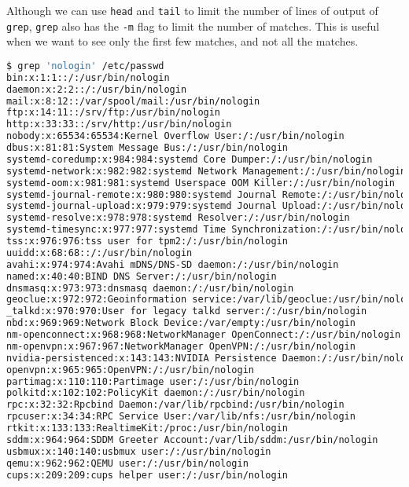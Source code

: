 Although we can use \lstinline|head| and \lstinline|tail| to limit the number of lines of output of \lstinline|grep|, \lstinline|grep| also has the \lstinline|-m| flag to limit the number of matches. This is useful when we want to see only the first few matches, and not all the matches.

\begin{lstlisting}[language=bash]
$ grep 'nologin' /etc/passwd
bin:x:1:1::/:/usr/bin/nologin
daemon:x:2:2::/:/usr/bin/nologin
mail:x:8:12::/var/spool/mail:/usr/bin/nologin
ftp:x:14:11::/srv/ftp:/usr/bin/nologin
http:x:33:33::/srv/http:/usr/bin/nologin
nobody:x:65534:65534:Kernel Overflow User:/:/usr/bin/nologin
dbus:x:81:81:System Message Bus:/:/usr/bin/nologin
systemd-coredump:x:984:984:systemd Core Dumper:/:/usr/bin/nologin
systemd-network:x:982:982:systemd Network Management:/:/usr/bin/nologin
systemd-oom:x:981:981:systemd Userspace OOM Killer:/:/usr/bin/nologin
systemd-journal-remote:x:980:980:systemd Journal Remote:/:/usr/bin/nologin
systemd-journal-upload:x:979:979:systemd Journal Upload:/:/usr/bin/nologin
systemd-resolve:x:978:978:systemd Resolver:/:/usr/bin/nologin
systemd-timesync:x:977:977:systemd Time Synchronization:/:/usr/bin/nologin
tss:x:976:976:tss user for tpm2:/:/usr/bin/nologin
uuidd:x:68:68::/:/usr/bin/nologin
avahi:x:974:974:Avahi mDNS/DNS-SD daemon:/:/usr/bin/nologin
named:x:40:40:BIND DNS Server:/:/usr/bin/nologin
dnsmasq:x:973:973:dnsmasq daemon:/:/usr/bin/nologin
geoclue:x:972:972:Geoinformation service:/var/lib/geoclue:/usr/bin/nologin
_talkd:x:970:970:User for legacy talkd server:/:/usr/bin/nologin
nbd:x:969:969:Network Block Device:/var/empty:/usr/bin/nologin
nm-openconnect:x:968:968:NetworkManager OpenConnect:/:/usr/bin/nologin
nm-openvpn:x:967:967:NetworkManager OpenVPN:/:/usr/bin/nologin
nvidia-persistenced:x:143:143:NVIDIA Persistence Daemon:/:/usr/bin/nologin
openvpn:x:965:965:OpenVPN:/:/usr/bin/nologin
partimag:x:110:110:Partimage user:/:/usr/bin/nologin
polkitd:x:102:102:PolicyKit daemon:/:/usr/bin/nologin
rpc:x:32:32:Rpcbind Daemon:/var/lib/rpcbind:/usr/bin/nologin
rpcuser:x:34:34:RPC Service User:/var/lib/nfs:/usr/bin/nologin
rtkit:x:133:133:RealtimeKit:/proc:/usr/bin/nologin
sddm:x:964:964:SDDM Greeter Account:/var/lib/sddm:/usr/bin/nologin
usbmux:x:140:140:usbmux user:/:/usr/bin/nologin
qemu:x:962:962:QEMU user:/:/usr/bin/nologin
cups:x:209:209:cups helper user:/:/usr/bin/nologin

\end{lstlisting}
